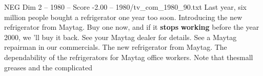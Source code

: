 \begin{textsample}{NEG Dim 2 – 1980 – Score -2.00 – 1980/tv\_com\_1980\_90.txt}  \label{ex:f2_neg_022}
Last year, six million people bought a refrigerator one year too soon.
Introducing the new refrigerator from Maytag.
Buy one now, and if it \textbf{stops} \textbf{working} before the year 2000, we 'll buy it back.
See your Maytag dealer for details.
See a Maytag repairman in our commercials.
The new refrigerator from Maytag.
The dependability of the refrigerators for Maytag office workers.
Note that thesmall greases and the complicated

\end{textsample}
